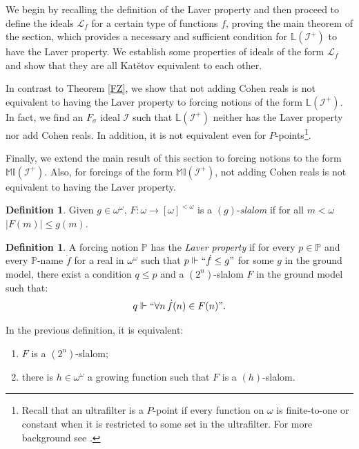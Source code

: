\documentclass{amsart}
\theoremstyle{definition}
\newtheorem{definition}[theorem]{Definition}
\theoremstyle{remark}
\numberwithin{equation}{section}
\newcommand{\lf}{\mathcal{L}_f}
\newcommand{\li}{\mathbb{L}(\mathcal{I}^+)}
\newcommand{\mil}{\mathbb{MI}}
\newcommand{\id}{\mathcal{I}}
\begin{document}
We begin by recalling the definition of the Laver property and then proceed to define the ideals $\mathcal{L}_f$ for a certain type of functions $f$, proving the main theorem of the section, which provides a necessary and sufficient condition for $\mathbb{L}(\mathcal{I}^+)$ to have the Laver property. 
We establish some properties of ideals of the form $\lf$ and show that they are all Kat\v{e}tov equivalent to each other.



In contrast to Theorem \ref{FZ}, we show that not adding Cohen reals is not equivalent to having the Laver property to forcing notions of the form $\li$. In fact, we find an $F_\sigma$ ideal $\id$ such that $\mathbb{L}(\mathcal{I}^+)$ neither has the Laver property nor add Cohen reals. In addition, it is not equivalent even for $P$-points\footnote{ Recall that an ultrafilter is a $P$-point if every function on $\omega$ is finite-to-one or constant when it is restricted to some set in the ultrafilter. For more background see \cite{ultra}.}.

Finally, we extend the main result of this section to forcing notions to the form $\mil(\id^+)$. Also, for forcings of the form $\mil(\id^+)$, not adding Cohen reals is not equivalent to having the Laver property.

\begin{definition}
    Given $g\in \omega^\omega$, $F:\omega\rightarrow [\omega]^{<\omega}$ is a $(g)$-\emph{slalom} if for all $m<\omega$ $|F(m)|\leq g(m)$.
\end{definition}

\begin{definition}\label{LP}
    A forcing notion $\mathbb{P}$ has the \emph{Laver property} if for every $p\in \mathbb{P}$ and every $\mathbb{P}$-name $\dot{f}$ for a real in $\omega^\omega$ such that $p\Vdash ``\dot f\leq g"$ for some $g$ in the ground model, there exist a condition $q\leq p$ and a $(2^n)$-slalom $F$ in the ground model such that:
\[
q \Vdash ``\forall n\,\dot{f}(n) \in F(n)".
\]
\end{definition}

In the previous definition, it is equivalent:
\begin{enumerate}
    \item $F$ is a $(2^n)$-slalom;
    \item there is $h\in \omega^\omega$ a growing function such that $F$ is a $(h)$-slalom.
\end{enumerate} 
\end{document}

